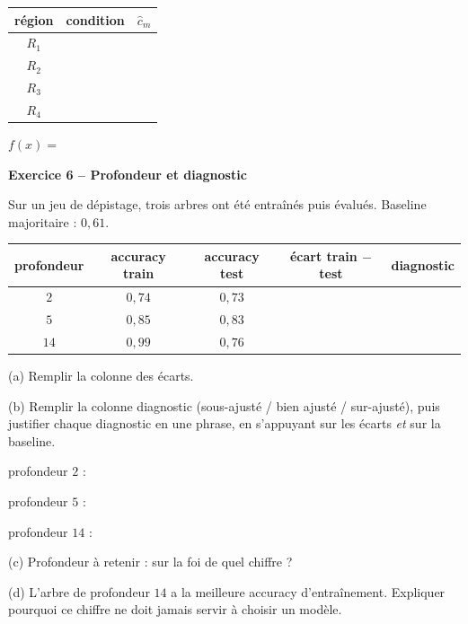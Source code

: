 \documentclass[10pt,a4paper]{article}
\newcommand{\repligne}{\par\vspace{0.42cm}\noindent\dotfill}
\begin{document}
\vspace{0.15cm}
{\small
\renewcommand{\arraystretch}{1.9}
\begin{tabular}{|c|p{9cm}|c|}
\hline
région & condition & $\hat c_m$\\
\hline
$R_1$ & & \\
\hline
$R_2$ & & \\
\hline
$R_3$ & & \\
\hline
$R_4$ & & \\
\hline
\end{tabular}
}

\vspace{0.35cm}
$f(x) = $ \dotfill

\vspace{0.5cm}

\textbf{\large Exercice 6 -- Profondeur et diagnostic}

\vspace{0.15cm}

Sur un jeu de dépistage, trois arbres ont été entraînés puis évalués. Baseline majoritaire : $0{,}61$.

\vspace{0.15cm}
{\small
\renewcommand{\arraystretch}{1.9}
\begin{tabular}{|c|c|c|c|c|}
\hline
profondeur & accuracy train & accuracy test & écart train $-$ test & diagnostic\\
\hline
$2$  & $0{,}74$ & $0{,}73$ & & \\
\hline
$5$  & $0{,}85$ & $0{,}83$ & & \\
\hline
$14$ & $0{,}99$ & $0{,}76$ & & \\
\hline
\end{tabular}
}

\vspace{0.2cm}
(a) Remplir la colonne des écarts.

\vspace{0.15cm}
(b) Remplir la colonne diagnostic (sous-ajusté / bien ajusté / sur-ajusté), puis justifier chaque diagnostic en une phrase, en s'appuyant sur les écarts \emph{et} sur la baseline.

\vspace{0.2cm}
profondeur $2$ : \dotfill
\repligne

\vspace{0.2cm}
profondeur $5$ : \dotfill
\repligne

\vspace{0.2cm}
profondeur $14$ : \dotfill
\repligne

\vspace{0.25cm}
(c) Profondeur à retenir : \makebox[1.5cm]{\dotfill} \quad sur la foi de quel chiffre ? \dotfill

\vspace{0.25cm}
(d) L'arbre de profondeur $14$ a la meilleure accuracy d'entraînement. Expliquer pourquoi ce chiffre ne doit jamais servir à choisir un modèle.
\repligne
\repligne
\repligne
\repligne
\end{document}
